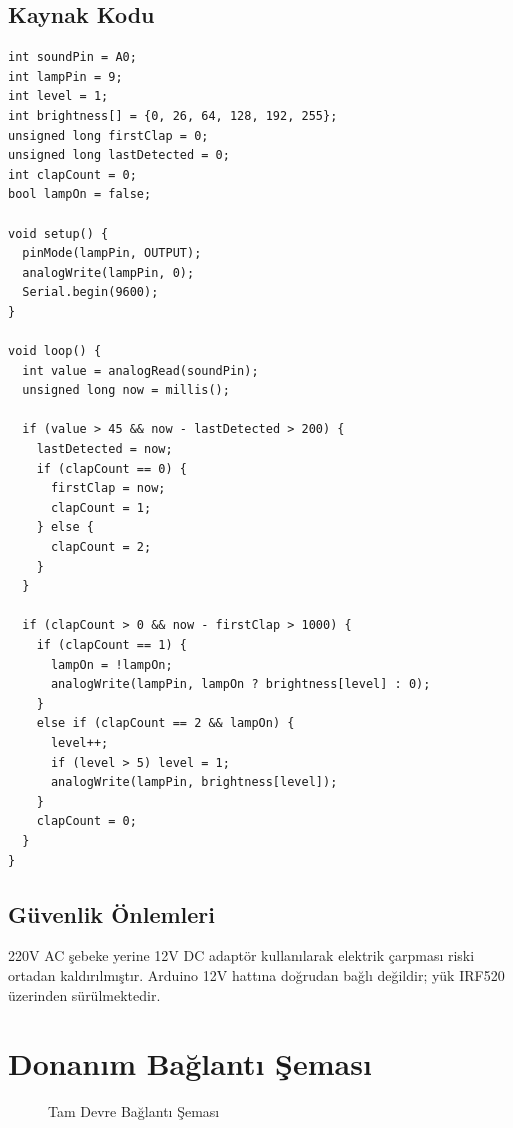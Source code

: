 \documentclass[12pt, a4paper]{article}
\begin{document}
\subsection{Kaynak Kodu}

\begin{lstlisting}[style=cstyle, caption={Akustik lamba kontrolü -- Arduino kodu}]
int soundPin = A0;
int lampPin = 9;
int level = 1;
int brightness[] = {0, 26, 64, 128, 192, 255};
unsigned long firstClap = 0;
unsigned long lastDetected = 0;
int clapCount = 0;
bool lampOn = false;

void setup() {
  pinMode(lampPin, OUTPUT);
  analogWrite(lampPin, 0);
  Serial.begin(9600);
}

void loop() {
  int value = analogRead(soundPin);
  unsigned long now = millis();

  if (value > 45 && now - lastDetected > 200) {
    lastDetected = now;
    if (clapCount == 0) {
      firstClap = now;
      clapCount = 1;
    } else {
      clapCount = 2;
    }
  }

  if (clapCount > 0 && now - firstClap > 1000) {
    if (clapCount == 1) {
      lampOn = !lampOn;
      analogWrite(lampPin, lampOn ? brightness[level] : 0);
    } 
    else if (clapCount == 2 && lampOn) {
      level++;
      if (level > 5) level = 1;
      analogWrite(lampPin, brightness[level]);
    }
    clapCount = 0;
  }
}
\end{lstlisting}

\subsection{Güvenlik Önlemleri}

220V AC şebeke yerine 12V DC adaptör kullanılarak elektrik çarpması riski ortadan kaldırılmıştır. Arduino 12V hattına doğrudan bağlı değildir; yük IRF520 üzerinden sürülmektedir.

\section{Donanım Bağlantı Şeması}

\begin{figure}[H]
  \centering
  \fbox{\rule{0pt}{6cm}\rule{0.9\textwidth}{0pt}}
  \caption{Tam Devre Bağlantı Şeması}
  \label{fig:devre}
\end{figure}
\end{document}

